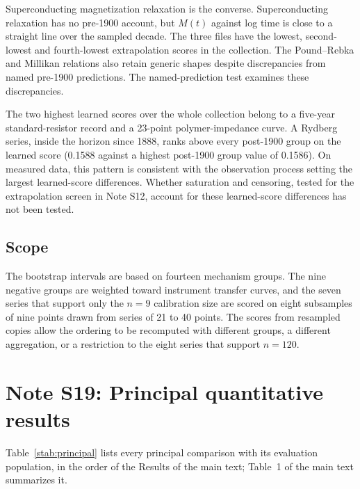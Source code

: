 \documentclass{article}
\begin{document}
Superconducting magnetization relaxation is the converse. Superconducting relaxation has no pre-1900 account, but $M(t)$ against log time is close to a straight line over the sampled decade. The three files have the lowest, second-lowest and fourth-lowest extrapolation scores in the collection. The Pound--Rebka and Millikan relations also retain generic shapes despite discrepancies from named pre-1900 predictions. The named-prediction test examines these discrepancies.

The two highest learned scores over the whole collection belong to a five-year standard-resistor record and a 23-point polymer-impedance curve. A Rydberg series, inside the horizon since 1888, ranks above every post-1900 group on the learned score (0.1588 against a highest post-1900 group value of 0.1586). On measured data, this pattern is consistent with the observation process setting the largest learned-score differences. Whether saturation and censoring, tested for the extrapolation screen in Note S12, account for these learned-score differences has not been tested.

\subsection{Scope}

The bootstrap intervals are based on fourteen mechanism groups. The nine negative groups are weighted toward instrument transfer curves, and the seven series that support only the $n = 9$ calibration size are scored on eight subsamples of nine points drawn from series of 21 to 40 points. The scores from resampled copies allow the ordering to be recomputed with different groups, a different aggregation, or a restriction to the eight series that support $n = 120$.

\section{Note S19: Principal quantitative results}

Table~\ref{stab:principal} lists every principal comparison with its evaluation population, in the order of the Results of the main text; Table~1 of the main text summarizes it.
\end{document}
